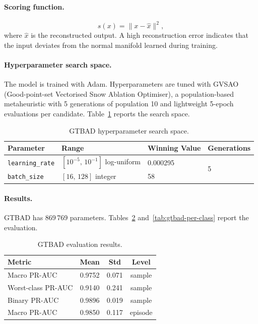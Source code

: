 \paragraph{Scoring function.}
\begin{equation}
    s(x) = \|x - \hat{x}\|^2,
\end{equation}
where $\hat{x}$ is the reconstructed output. A high reconstruction error indicates that the input deviates from the normal manifold learned during training.

\paragraph{Hyperparameter search space.}
The model is trained with Adam. Hyperparameters are tuned with GVSAO (Good-point-set Vectorised Snow Ablation Optimiser), a population-based metaheuristic with 5 generations of population 10 and lightweight 5-epoch evaluations per candidate. Table~\ref{tab:gtbad-hpo} reports the search space.
\begin{table}[H]
\centering
\caption{GTBAD hyperparameter search space.\label{tab:gtbad-hpo}}
\begin{tabular}{llll}
\toprule
\textbf{Parameter} & \textbf{Range} & \textbf{Winning Value} & \textbf{Generations} \\
\midrule
\texttt{learning\_rate} & $[10^{-5},\,10^{-1}]$ log-uniform & 0.000295 & \multirow{2}{*}{5} \\
\texttt{batch\_size}    & $[16,\,128]$ integer               & 58   \\
\bottomrule
\end{tabular}
\end{table}

\paragraph{Results.}
GTBAD has 869\,769 parameters. Tables~\ref{tab:gtbad-results} and~\ref{tab:gtbad-per-class} report the evaluation.

\begin{table}[H]
\centering
\caption{GTBAD evaluation results.\label{tab:gtbad-results}}
\begin{tabular}{lccc}
\toprule
\textbf{Metric} & \textbf{Mean} & \textbf{Std} & \textbf{Level} \\
\midrule
Macro PR-AUC & 0.9752 & 0.071 & sample \\
Worst-class PR-AUC     & 0.9140 & 0.241 & sample \\
Binary PR-AUC          & 0.9896 & 0.019 & sample \\
Macro PR-AUC & 0.9850 & 0.117 & episode \\
\bottomrule
\end{tabular}
\end{table}


